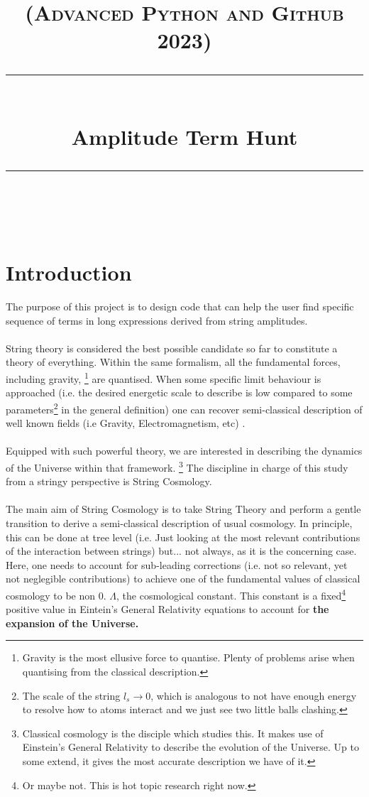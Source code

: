\documentclass[11pt]{article} %
\title{	
	\normalfont\normalsize
	\textsc{(Advanced Python and Github 2023)}\\ %
	\vspace{5pt} %
	\rule{\linewidth}{0.2pt}\\ %
	\vspace{10pt} %
	{\huge Amplitude Term Hunt}\\ %
	\vspace{1pt} %
	\rule{\linewidth}{2pt}\\ %
	\vspace{-35pt} %
	\date{}
}
\begin{document}
\maketitle 


\section{Introduction}

The purpose of this project is to design code that can help the user find specific sequence of terms in long expressions derived from string amplitudes.\\
\\
String theory is considered the best possible candidate so far to constitute a theory of everything. Within the same formalism, all the fundamental forces, including gravity, \footnote{Gravity is the most ellusive force to quantise. Plenty of problems arise when quantising from the classical description.} are quantised. When some specific limit behaviour is approached (i.e. the desired energetic scale to describe is low compared to some parameters\footnote{The scale of the string $\textit{l}_{s} \rightarrow 0$, which is analogous to not have enough energy to resolve how to atoms interact and we just see two little balls clashing.} in the general definition) one can recover semi-classical description of well known fields (i.e Gravity, Electromagnetism, etc) .\\
\\
Equipped with such powerful theory, we are interested in describing the dynamics of the Universe within that framework. \footnote{Classical cosmology is the disciple which studies this. It makes use of Einstein's General Relativity to describe the evolution of the Universe. Up to some extend, it gives the most accurate description we have of it.} The discipline in charge of this study from a stringy perspective is String Cosmology.\\
\\
The main aim of String Cosmology is to take String Theory and perform a gentle transition to derive a semi-classical description of usual cosmology. In principle, this can be done at tree level (i.e. Just looking at the most relevant contributions of the interaction between strings) but... not always, as it is the concerning case. Here, one needs to account for sub-leading corrections (i.e. not so relevant, yet not neglegible contributions) to achieve one of the fundamental values of classical cosmology to be non 0. $\Lambda$, the cosmological constant. This constant is a fixed\footnote{Or maybe not. This is hot topic research right now.} positive value in Eintein's General Relativity equations to account for \textbf{the expansion of the Universe.}\\
\end{document}
